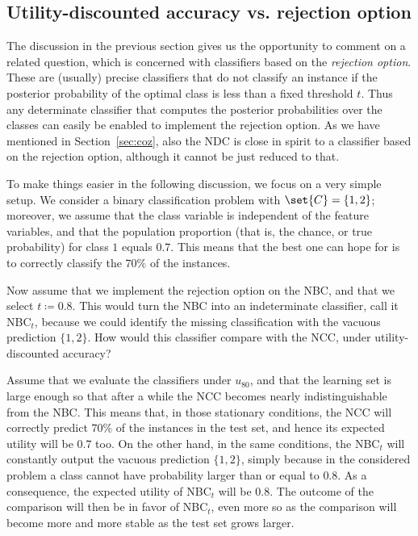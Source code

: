\documentclass[a4paper,10pt,reqno]{amsart}
\theoremstyle{remark}
\begin{document}
\subsection{Utility-discounted accuracy vs. rejection option}\label{sec:rejopt}
The discussion in the previous section gives us the opportunity to comment on a related question, which is concerned with classifiers based on the \emph{rejection option}. These are (usually) precise classifiers that do not classify an instance if the posterior probability of the optimal class is less than a fixed threshold $t$. Thus any determinate classifier that computes the posterior probabilities over the classes can easily be enabled to implement the rejection option. As we have mentioned in Section~\ref{sec:coz}, also the NDC is close in spirit to a classifier based on the rejection option, although it cannot be just reduced to that.

To make things easier in the following discussion, we focus on a very simple setup. We consider a binary classification problem with $\set{C}=\{1,2\}$; moreover, we assume that the class variable is independent of the feature variables, and that the population proportion (that is, the chance, or true probability) for class $1$ equals $0.7$. This means that the best one can hope for is to correctly classify the $70\%$ of the instances. 

Now assume that we implement the rejection option on the NBC, and that we select $t\coloneqq 0.8$. This would turn the NBC into an indeterminate classifier, call it NBC$_t$, because we could identify the missing classification with the vacuous prediction $\{1,2\}$. How would this classifier compare with the NCC, under utility-discounted accuracy?

Assume that we evaluate the classifiers under $u_{80}$, and that the learning set is large enough so that after a while the NCC becomes nearly indistinguishable from the NBC. This means that, in those stationary conditions, the NCC will correctly predict $70\%$ of the instances in the test set, and hence its expected utility will be $0.7$ too. On the other hand, in the same conditions, the NBC$_t$ will constantly output the vacuous prediction $\{1,2\}$, simply because in the considered problem a class cannot have probability larger than or equal to $0.8$. As a consequence, the expected utility of NBC$_t$ will be $0.8$. The outcome of the comparison will then be in favor of NBC$_t$, even more so as the comparison will become more and more stable as the test set grows larger.
\end{document}
